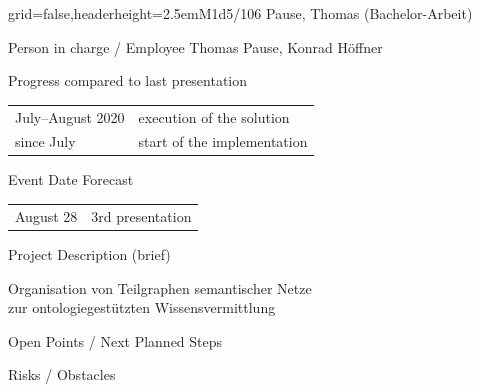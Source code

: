 \documentclass[english]{kiesgrube}
\begin{document}
\begin{poster}{grid=false,headerheight=2.5em}{}{M1d5/106 Pause, Thomas (Bachelor-Arbeit)}{}{}
\begin{posterbox}[name=person,column=0,row=0]{Person in charge / Employee}
Thomas Pause, Konrad Höffner
\end{posterbox}
\begin{posterbox}[name=progress,below=person]{Progress compared to last presentation}
\begin{tabulary}{\textwidth}{lL}
July--August 2020	&execution of the solution\\
since July		&start of the implementation\\
\end{tabulary}
\end{posterbox}
\begin{posterbox}[name=event,below=progress]{Event Date Forecast}
\begin{tabulary}{\textwidth}{lL}
August 28	&3rd presentation\\
\end{tabulary}
\end{posterbox}
\begin{posterbox}[name=description,column=1,row=0]{Project Description (brief)}
\begin{center}
Organisation von Teilgraphen semantischer Netze\\
zur ontologiegestützten Wissensvermittlung
\end{center}
\end{posterbox}
\begin{posterbox}[name=open,column=1,below=description]{Open Points / Next Planned Steps}
\end{posterbox}
\begin{posterbox}[name=risks,column=1,below=open]{Risks / Obstacles}

\end{posterbox}
\end{poster}
\end{document}
